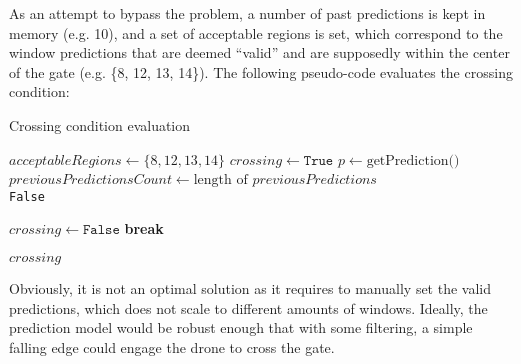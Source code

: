 As an attempt to bypass the problem, a number of past predictions is kept in
memory (e.g. 10), and a set of acceptable regions is set, which correspond to
the window predictions that are deemed ``valid'' and are supposedly within the
center of the gate (e.g. \{8, 12, 13, 14\}). The following pseudo-code evaluates
the crossing condition:

\makeatletter
\def\BState{\State\hskip-\ALG@thistlm}
\makeatother

\begin{algorithm}
	\caption{Crossing condition evaluation}\label{alg:crosscond}
	\begin{algorithmic}[1]
			\State $\textit{acceptableRegions} \gets \{8, 12, 13, 14\}$
			\State $crossing \gets \texttt{True}$
			\State $p \gets \text{getPrediction()}$
			\State $previousPredictionsCount \gets \text{length of }
				\textit{previousPredictions}$
			~\\
				\Return \texttt{False}
			\EndIf

					\State $crossing \gets \texttt{False}$
					\State \textbf{break}
				\EndIf
			\EndFor

			\Return $\textit{crossing}$
		\EndProcedure
	\end{algorithmic}
\end{algorithm}

Obviously, it is not an optimal solution as it requires to manually set the
valid predictions, which does not scale to different amounts of windows.
Ideally, the prediction model would be robust enough that with some filtering,
a simple falling edge could engage the drone to cross the gate.
